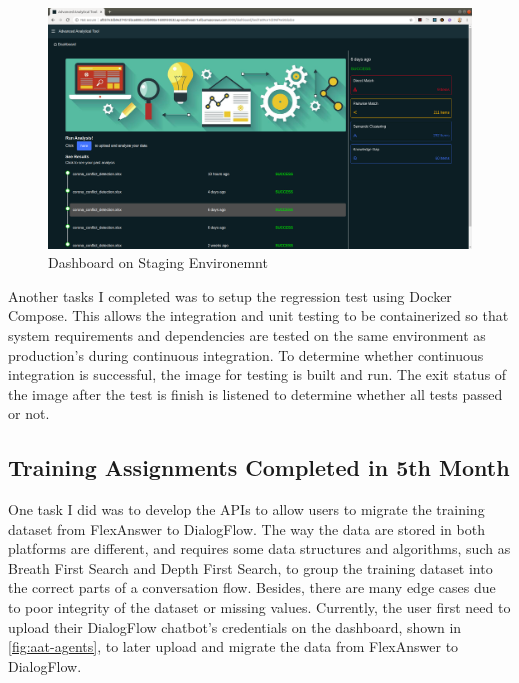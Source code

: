 \begin{figure}[h!]
	\begin{center}
		\includegraphics[width=450px]{assets/images/aat-staging.png}
		\caption{Dashboard on Staging Environemnt}
		\label{fig:aat-staging}
	\end{center}
\end{figure}

\noindent
Another tasks I completed was to setup the regression test using Docker Compose. This allows the integration and unit testing to be containerized so that system requirements and dependencies are tested on the same environment as production's during continuous integration. To determine whether continuous integration is successful, the image for testing is built and run. The exit status of the image after the test is finish is listened to determine whether all tests passed or not.

\subsection{Training Assignments Completed in 5th Month}
\noindent
One task I did was to develop the APIs to allow users to migrate the training dataset from FlexAnswer to DialogFlow. The way the data are stored in both platforms are different, and requires some data structures and algorithms, such as Breath First Search and Depth First Search, to group the training dataset into the correct parts of a conversation flow. Besides, there are many edge cases due to poor integrity of the dataset or missing values. Currently, the user first need to upload their DialogFlow chatbot's credentials on the dashboard, shown in \ref{fig:aat-agents}, to later upload and migrate the data from FlexAnswer to DialogFlow.

